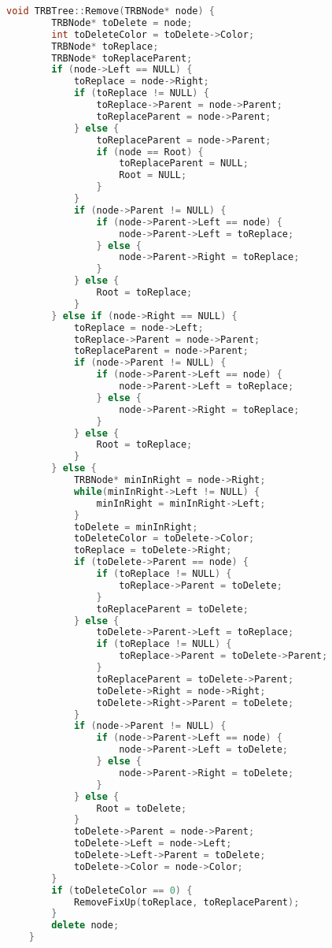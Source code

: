 \begin{lstlisting}[language=C++]
    void TRBTree::Remove(TRBNode* node) {
        TRBNode* toDelete = node;
        int toDeleteColor = toDelete->Color;
        TRBNode* toReplace;
        TRBNode* toReplaceParent;
        if (node->Left == NULL) {
            toReplace = node->Right;
            if (toReplace != NULL) {
                toReplace->Parent = node->Parent;
                toReplaceParent = node->Parent;
            } else {
                toReplaceParent = node->Parent;
                if (node == Root) {
                    toReplaceParent = NULL;
                    Root = NULL;
                }
            }
            if (node->Parent != NULL) {
                if (node->Parent->Left == node) {
                    node->Parent->Left = toReplace;
                } else {
                    node->Parent->Right = toReplace;
                }
            } else {
                Root = toReplace;
            }
        } else if (node->Right == NULL) {
            toReplace = node->Left;
            toReplace->Parent = node->Parent;
            toReplaceParent = node->Parent;
            if (node->Parent != NULL) {
                if (node->Parent->Left == node) {
                    node->Parent->Left = toReplace;
                } else {
                    node->Parent->Right = toReplace;
                }
            } else {
                Root = toReplace;
            }
        } else {
            TRBNode* minInRight = node->Right;
            while(minInRight->Left != NULL) {
                minInRight = minInRight->Left;
            }
            toDelete = minInRight;
            toDeleteColor = toDelete->Color;
            toReplace = toDelete->Right;
            if (toDelete->Parent == node) {
                if (toReplace != NULL) {
                    toReplace->Parent = toDelete;
                }
                toReplaceParent = toDelete;
            } else {
                toDelete->Parent->Left = toReplace;
                if (toReplace != NULL) {
                    toReplace->Parent = toDelete->Parent;
                }
                toReplaceParent = toDelete->Parent;
                toDelete->Right = node->Right;
                toDelete->Right->Parent = toDelete;
            }
            if (node->Parent != NULL) {
                if (node->Parent->Left == node) {
                    node->Parent->Left = toDelete;
                } else {
                    node->Parent->Right = toDelete;
                }
            } else {
                Root = toDelete;
            }
            toDelete->Parent = node->Parent;
            toDelete->Left = node->Left;
            toDelete->Left->Parent = toDelete;
            toDelete->Color = node->Color;
        }
        if (toDeleteColor == 0) {
            RemoveFixUp(toReplace, toReplaceParent);
        }
        delete node;
    }


\end{lstlisting}
